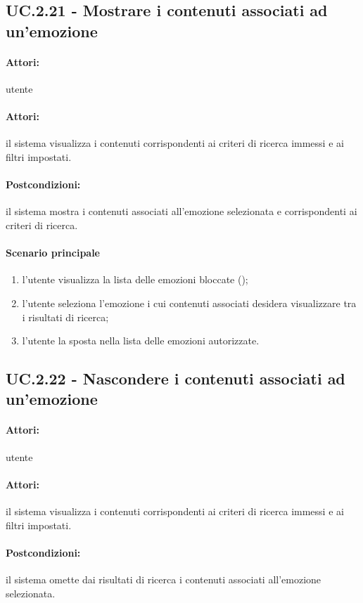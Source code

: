 \documentclass[10pt,a4paper,headinclude,footinclude,hidelinks]{scrreprt} %
\begin{document}
	\subsection[UC.2.21]{UC.2.21 - Mostrare i contenuti associati ad un'emozione}
	\label{sec:stage:ar:uc:2_21}
	\paragraph{Attori:} utente
	\paragraph{Attori:} il sistema visualizza i contenuti corrispondenti ai criteri di ricerca immessi e ai filtri impostati.
	\paragraph{Postcondizioni:} il sistema mostra i contenuti associati all'emozione selezionata e corrispondenti ai criteri di ricerca.
	\paragraph{Scenario principale}
	\begin{enumerate}
	\item l'utente visualizza la lista delle emozioni bloccate ();
	\item l'utente seleziona l'emozione i cui contenuti associati desidera visualizzare tra i risultati di ricerca;
	\item l'utente la sposta nella lista delle emozioni autorizzate.
	\end{enumerate}

	\subsection[UC.2.22]{UC.2.22 - Nascondere i contenuti associati ad un'emozione}
	\label{sec:stage:ar:uc:2_22}
	\paragraph{Attori:} utente
	\paragraph{Attori:} il sistema visualizza i contenuti corrispondenti ai criteri di ricerca immessi e ai filtri impostati.
	\paragraph{Postcondizioni:} il sistema omette dai risultati di ricerca i contenuti associati all'emozione selezionata.
\end{document}
